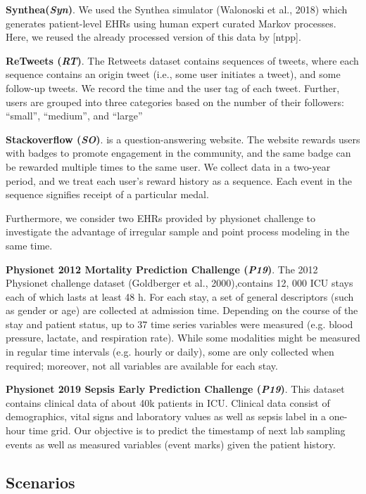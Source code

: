 \documentclass[journal,twoside,web]{ieeecolor}
\begin{document}
\textbf{Synthea(\emph{Syn})}.
We used the Synthea simulator (Walonoski et al., 2018) which generates patient-level EHRs using human expert curated Markov processes. Here, we reused the already processed version of this data by [ntpp].

\textbf{ReTweets (\emph{RT})}.
The Retweets dataset contains sequences of tweets, where each sequence contains an origin tweet (i.e., some user initiates a tweet), and some follow-up tweets. We record the time and the user tag of each tweet. Further, users are grouped into three categories based on the number of their followers: “small”, “medium”, and “large”

\textbf{Stackoverflow (\emph{SO})}.
is a question-answering website. The website rewards users with badges to promote engagement in the community, and the same badge can be rewarded multiple times to the same user. We collect data in a two-year period, and we treat each user’s reward history as a sequence. Each event in the sequence signifies receipt of a particular medal.

Furthermore, we consider two EHRs provided by physionet challenge to investigate the advantage of irregular sample and point process modeling in the same time.

\textbf{Physionet 2012 Mortality Prediction Challenge (\emph{P19})}.
The 2012 Physionet challenge dataset (Goldberger et al., 2000),contains 12, 000 ICU stays each of which lasts at least 48 h. For each stay, a set of general descriptors (such as gender or age) are collected at admission time. Depending on the course of the stay and patient status, up to 37 time series variables were measured (e.g. blood pressure, lactate, and respiration rate). While some modalities might be measured in regular time intervals (e.g. hourly or daily), some are only collected when required; moreover, not all variables are available for each stay.

\textbf{Physionet 2019 Sepsis Early Prediction Challenge (\emph{P19})}.
This dataset contains clinical data of about 40k patients in ICU. Clinical data consist of demographics, vital signs and laboratory values as well as sepsis label in a one-hour time grid. Our objective is to predict the timestamp of next lab sampling events as well as measured variables (event marks) given the patient history.



\subsection*{Scenarios}
\end{document}
